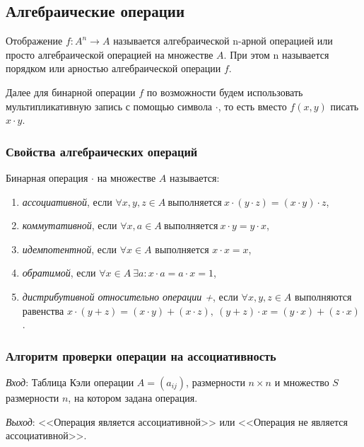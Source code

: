 \documentclass[bachelor, och, labwork]{shiza}
\begin{document}
\subsection{Алгебраические операции}

Отображение $f:A^n\rightarrow A$ называется алгебраической n-арной операцией или
просто алгебраической операцией на множестве $A$. При этом n называется порядком
или арностью алгебраической операции $f$.

Далее для бинарной операции $f$ по возможности будем использовать мультипликативную
запись с помощью символа $\cdot$, то есть вместо $f(x,y)$ писать $x\cdot y$.

\subsubsection{Свойства алгебраических операций}
Бинарная операция $\cdot$ на множестве $A$ называется:
\begin{enumerate}
    \item \textit{ассоциативной}, если $\forall x,y,z \in A ~\text{выполняется}~ x\cdot (y\cdot z) = (x\cdot y)\cdot z$,
    \item \textit{коммутативной}, если $\forall x,a \in A ~\text{выполняется}~ x\cdot y = y\cdot x$,
    \item \textit{идемпотентной}, если $\forall x \in A$ выполняется $x\cdot x=x$,
    \item \textit{обратимой}, если $\forall x \in A ~\exists a: x\cdot a = a\cdot x = 1$,
    \item \textit{дистрибутивной относительно операции +}, если $\forall x,y,z \in A$
    выполняются равенства $x\cdot (y+z)=(x\cdot y)+(x\cdot z),~ (y+z)\cdot x=(y\cdot x)+(z\cdot x)$.
\end{enumerate}

\subsubsection{Алгоритм проверки операции на ассоциативность}

\textit{Вход}: Таблица Кэли операции $A=(a_{ij})$, размерности $n\times n$ и
множество $S$ размерности $n$, на котором задана операция.

\textit{Выход}: <<Операция является ассоциативной>> или <<Операция не является
ассоциативной>>.
\end{document}

